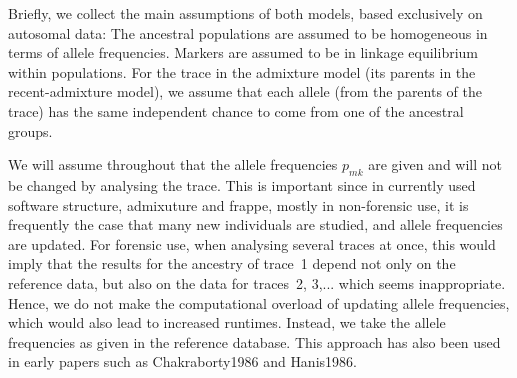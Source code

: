 \documentclass[12pt]{article}
\theoremstyle{definition}
\begin{document}
{\color{blue}Briefly, we collect the main assumptions of both models, based  exclusively on autosomal data: The ancestral populations are assumed to be homogeneous in terms of allele frequencies. Markers are assumed to be in linkage equilibrium within populations. For the trace in the admixture model (its parents in the recent-admixture model), we assume that each allele (from the parents of the trace) has the same independent chance to come from one of the ancestral groups.}

We will assume throughout that the allele frequencies $p_{mk}$ are given and will not be changed by analysing the trace. This is important since in currently used software {\sc  structure}, {\sc admixuture} and {\sc frappe}, mostly in non-forensic use, it is frequently the case that many new individuals are studied, and allele frequencies are updated. For forensic use, when analysing several traces at once, this would imply that the results for the ancestry of trace~1 depend not only on the reference data, but also on the data for traces~2, 3,... which seems inappropriate. Hence, we do not make the computational overload of updating allele frequencies, which would also lead to increased runtimes. Instead, we take the allele frequencies as given in the reference database. This approach has also been used in early papers such as  \cite{article}{Chakraborty1986} and \cite{article}{Hanis1986}.
\end{document}
